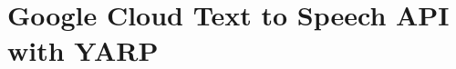 \chapter{Google Cloud Text to Speech API with YARP}
\label{md__2home_2runner_2work_2speech_2speech_2gh-pages_2speechInteraction_2modules_2googleDialog_2README}
